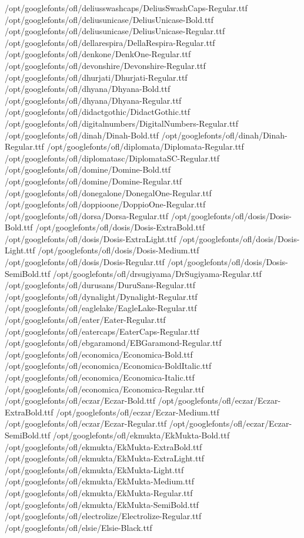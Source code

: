 /opt/googlefonts/ofl/deliusswashcaps/DeliusSwashCaps-Regular.ttf
/opt/googlefonts/ofl/deliusunicase/DeliusUnicase-Bold.ttf
/opt/googlefonts/ofl/deliusunicase/DeliusUnicase-Regular.ttf
/opt/googlefonts/ofl/dellarespira/DellaRespira-Regular.ttf
/opt/googlefonts/ofl/denkone/DenkOne-Regular.ttf
/opt/googlefonts/ofl/devonshire/Devonshire-Regular.ttf
/opt/googlefonts/ofl/dhurjati/Dhurjati-Regular.ttf
/opt/googlefonts/ofl/dhyana/Dhyana-Bold.ttf
/opt/googlefonts/ofl/dhyana/Dhyana-Regular.ttf
/opt/googlefonts/ofl/didactgothic/DidactGothic.ttf
/opt/googlefonts/ofl/digitalnumbers/DigitalNumbers-Regular.ttf
/opt/googlefonts/ofl/dinah/Dinah-Bold.ttf
/opt/googlefonts/ofl/dinah/Dinah-Regular.ttf
/opt/googlefonts/ofl/diplomata/Diplomata-Regular.ttf
/opt/googlefonts/ofl/diplomatasc/DiplomataSC-Regular.ttf
/opt/googlefonts/ofl/domine/Domine-Bold.ttf
/opt/googlefonts/ofl/domine/Domine-Regular.ttf
/opt/googlefonts/ofl/donegalone/DonegalOne-Regular.ttf
/opt/googlefonts/ofl/doppioone/DoppioOne-Regular.ttf
/opt/googlefonts/ofl/dorsa/Dorsa-Regular.ttf
/opt/googlefonts/ofl/dosis/Dosis-Bold.ttf
/opt/googlefonts/ofl/dosis/Dosis-ExtraBold.ttf
/opt/googlefonts/ofl/dosis/Dosis-ExtraLight.ttf
/opt/googlefonts/ofl/dosis/Dosis-Light.ttf
/opt/googlefonts/ofl/dosis/Dosis-Medium.ttf
/opt/googlefonts/ofl/dosis/Dosis-Regular.ttf
/opt/googlefonts/ofl/dosis/Dosis-SemiBold.ttf
/opt/googlefonts/ofl/drsugiyama/DrSugiyama-Regular.ttf
/opt/googlefonts/ofl/durusans/DuruSans-Regular.ttf
/opt/googlefonts/ofl/dynalight/Dynalight-Regular.ttf
/opt/googlefonts/ofl/eaglelake/EagleLake-Regular.ttf
/opt/googlefonts/ofl/eater/Eater-Regular.ttf
/opt/googlefonts/ofl/eatercaps/EaterCaps-Regular.ttf
/opt/googlefonts/ofl/ebgaramond/EBGaramond-Regular.ttf
/opt/googlefonts/ofl/economica/Economica-Bold.ttf
/opt/googlefonts/ofl/economica/Economica-BoldItalic.ttf
/opt/googlefonts/ofl/economica/Economica-Italic.ttf
/opt/googlefonts/ofl/economica/Economica-Regular.ttf
/opt/googlefonts/ofl/eczar/Eczar-Bold.ttf
/opt/googlefonts/ofl/eczar/Eczar-ExtraBold.ttf
/opt/googlefonts/ofl/eczar/Eczar-Medium.ttf
/opt/googlefonts/ofl/eczar/Eczar-Regular.ttf
/opt/googlefonts/ofl/eczar/Eczar-SemiBold.ttf
/opt/googlefonts/ofl/ekmukta/EkMukta-Bold.ttf
/opt/googlefonts/ofl/ekmukta/EkMukta-ExtraBold.ttf
/opt/googlefonts/ofl/ekmukta/EkMukta-ExtraLight.ttf
/opt/googlefonts/ofl/ekmukta/EkMukta-Light.ttf
/opt/googlefonts/ofl/ekmukta/EkMukta-Medium.ttf
/opt/googlefonts/ofl/ekmukta/EkMukta-Regular.ttf
/opt/googlefonts/ofl/ekmukta/EkMukta-SemiBold.ttf
/opt/googlefonts/ofl/electrolize/Electrolize-Regular.ttf
/opt/googlefonts/ofl/elsie/Elsie-Black.ttf

